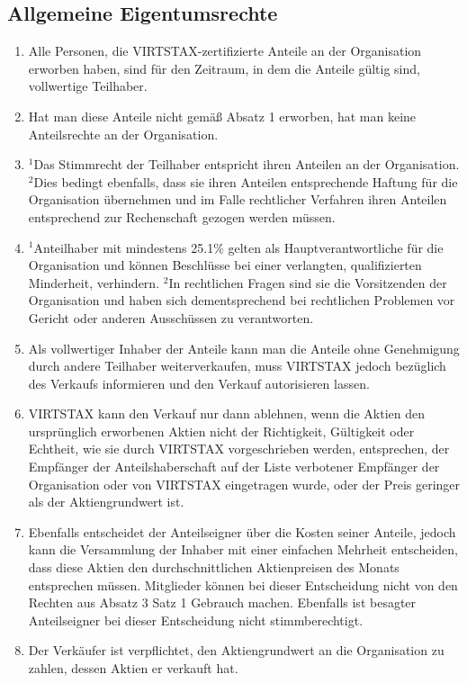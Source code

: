 \documentclass{article}
\begin{document}
\subsection{Allgemeine Eigentumsrechte}
\begin{enumerate}[(1)]
	\item Alle Personen, die VIRTSTAX-zertifizierte Anteile an der Organisation erworben haben, sind für den Zeitraum, in dem die Anteile gültig sind, vollwertige Teilhaber.
	\item Hat man diese Anteile nicht gemäß Absatz 1 erworben, hat man keine Anteilsrechte an der Organisation.
	\item $^{1}$Das Stimmrecht der Teilhaber entspricht ihren Anteilen an der Organisation. $^{2}$Dies bedingt ebenfalls, dass sie ihren Anteilen entsprechende Haftung für die Organisation übernehmen und im Falle rechtlicher Verfahren ihren Anteilen entsprechend zur Rechenschaft gezogen werden müssen.
	\item $^{1}$Anteilhaber mit mindestens 25.1\% gelten als Hauptverantwortliche für die Organisation und können Beschlüsse bei einer verlangten, qualifizierten Minderheit, verhindern. $^{2}$In rechtlichen Fragen sind sie die Vorsitzenden der Organisation und haben sich dementsprechend bei rechtlichen Problemen vor Gericht oder anderen Ausschüssen zu verantworten.
	\item Als vollwertiger Inhaber der Anteile kann man die Anteile ohne Genehmigung durch andere Teilhaber weiterverkaufen, muss VIRTSTAX jedoch bezüglich des Verkaufs informieren und den Verkauf autorisieren lassen.
	\item VIRTSTAX kann den Verkauf nur dann ablehnen, wenn die Aktien den ursprünglich erworbenen Aktien nicht der Richtigkeit, Gültigkeit oder Echtheit, wie sie durch VIRTSTAX vorgeschrieben werden, entsprechen, der Empfänger der Anteilshaberschaft auf der Liste verbotener Empfänger der Organisation oder von VIRTSTAX eingetragen wurde, oder der Preis geringer als der Aktiengrundwert ist.
	\item Ebenfalls entscheidet der Anteilseigner über die Kosten seiner Anteile, jedoch kann die Versammlung der Inhaber mit einer einfachen Mehrheit entscheiden, dass diese Aktien den durchschnittlichen Aktienpreisen des Monats entsprechen müssen. Mitglieder können bei dieser Entscheidung nicht von den Rechten aus Absatz 3 Satz 1 Gebrauch machen. Ebenfalls ist besagter Anteilseigner bei dieser Entscheidung nicht stimmberechtigt.
	\item Der Verkäufer ist verpflichtet, den Aktiengrundwert an die Organisation zu zahlen, dessen Aktien er verkauft hat.

\end{enumerate}
\end{document}
